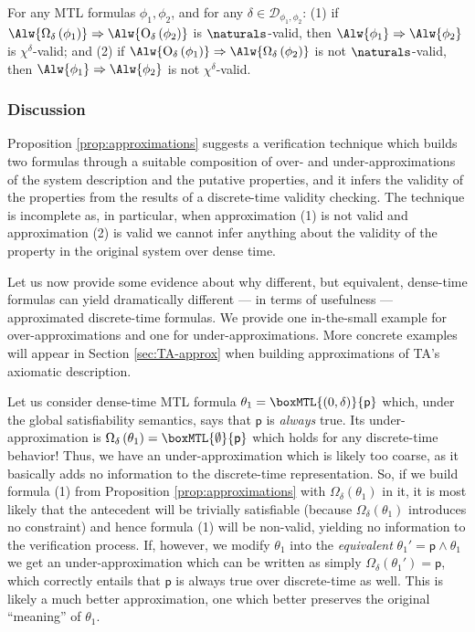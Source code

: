 \documentclass[a4paper]{article}
\newcommand{\pp}{\mathsf{p}}
\newcommand{\overap}[1]{\mathrm{O}_{\delta}\left({#1}\right)}
\newcommand{\underap}[1]{\Omega_{\delta}\left({#1}\right)}
\newcommand{\Dcal}{\mathcal{D}}
\theoremstyle{plain}
\theoremstyle{definition}
\begin{document}
\begin{proposition} \label{prop:approximations}
  For any MTL formulas $\phi_1, \phi_2$, and for any $\delta \in \Dcal_{\phi_1, \phi_2}$:
  (1) if $\Alw{{\underap{\phi_1}}} \Rightarrow \Alw{\overap{\phi_2}}$ is $\naturals$-valid,
		    then $\Alw{\phi_1} \Rightarrow \Alw{\phi_2}$ is $\chi^\delta$-valid;
and (2) if $\Alw{\overap{\phi_1}} \Rightarrow \Alw{\underap{\phi_2}}$ is not $\naturals$-valid,
		    then $\Alw{\phi_1} \Rightarrow \Alw{\phi_2}$ is not $\chi^\delta$-valid.
\end{proposition}



\subsubsection{Discussion}
Proposition \ref{prop:approximations} suggests a verification technique which builds two formulas through a suitable composition of over- and under-ap\-prox\-i\-ma\-tions of the system description and the putative properties, and it infers the validity of the properties from the results of a discrete-time validity checking.
The technique is incomplete as, in particular, when approximation (1) is not valid and approximation (2) is valid we cannot infer anything about the validity of the property in the original system over dense time.

Let us now provide some evidence about why different, but equivalent, dense-time formulas can yield dramatically different --- in terms of usefulness --- approximated discrete-time formulas.
We provide one in-the-small example for over-ap\-prox\-i\-ma\-tions and one for under-ap\-prox\-i\-ma\-tions.
More concrete examples will appear in Section \ref{sec:TA-approx} when building approximations of TA's axiomatic description.

Let us consider dense-time MTL formula $\theta_1 = \boxMTL{(0,\delta)}{\pp}$ which, under the global satisfiability semantics, says that $\pp$ is \emph{always} true.
Its under-ap\-prox\-i\-ma\-tion is $\underap{\theta_1} = \boxMTL{\emptyset}{\pp}$ which holds for any discrete-time behavior!
Thus, we have an under-ap\-prox\-i\-ma\-tion which is likely too coarse, as it basically adds no information to the discrete-time representation.
So, if we build formula (1) from Proposition \ref{prop:approximations} with $\underap{\theta_1}$ in it, it is most likely that the antecedent will be trivially satisfiable (because $\underap{\theta_1}$ introduces no constraint) and hence formula (1) will be non-valid, yielding no information to the verification process.
If, however, we modify $\theta_1$ into the \emph{equivalent} $\theta_1' = \pp \wedge \theta_1$ we get an under-ap\-prox\-i\-ma\-tion which can be written as simply $\underap{\theta_1'} = \pp$, which correctly entails that $\pp$ is always true over discrete-time as well.
This is likely a much better approximation, one which better preserves the original ``meaning'' of $\theta_1$.
\end{document}

